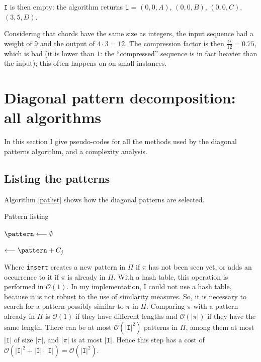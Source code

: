 \documentclass[a4paper,10pt]{article}
\newcommand{\guill}[1]{``#1''}
\newcommand{\bigO}[1]{\mathcal O\left( #1 \right)}
\begin{document}
\texttt{I} is then empty: the algorithm returns \texttt{L} = $(0,0,A)$, $(0,0,B)$, $(0,0,C)$, $(3,5,D)$.

Considering that chords have the same size as integers, the input sequence had a weight of $9$ and the output of $4\cdot3=12$. The compression factor is then $\frac{9}{12}=0.75$, which is bad (it is lower than $1$: the \guill{compressed} sequence is in fact heavier than the input); this often happens on on small instances.


\newpage
\section{Diagonal pattern decomposition: all algorithms}

In this section I give pseudo-codes for all the methods used by the diagonal patterns algorithm, and a complexity analysis.

\subsection*{Listing the patterns}

Algorithm \ref{patlist} shows how the diagonal patterns are selected.

\begin{algorithm}
\caption{Pattern listing \label{patlist}}
    
 


\Debut
{
	 {
		$\pattern \longleftarrow \emptyset$
		
		 {
			 {
				\pattern $\longleftarrow \pattern + C_j$
			}
		}
	}

	\Retour \Pat
}
\end{algorithm}

Where \texttt{insert} creates a new pattern in $\Pi$ if $\pi$ has not been seen yet, or adds an occurrence to it if $\pi$ is already in $\Pi$. With a hash table, this operation is performed in $\bigO{1}$. In my implementation, I could not use a hash table, because it is not robust to the use of similarity measures. So, it is necessary to search for a pattern possibly similar to $\pi$ in $\Pi$. Comparing $\pi$ with a pattern already in $\Pi$ is $\bigO{1}$ if they have different lengths and $\bigO{|\pi|}$ if they have the same length. There can be at most $\bigO{|\texttt{I}|^2}$ patterns in $\Pi$, among them at most $|\texttt{I}|$ of size $|\pi|$, and $|\pi|$ is at most $|\texttt{I}|$. Hence this step has a cost of $\bigO{|\texttt{I}|^2+|\texttt{I}|\cdot|\texttt{I}|}=\bigO{|\texttt{I}|^2}$.
\end{document}
